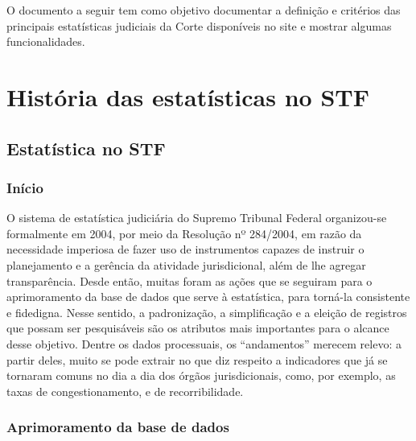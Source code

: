 \documentclass[
]{book}
\begin{document}
O documento a seguir tem como objetivo documentar a definição e critérios das principais estatísticas judiciais da Corte disponíveis no site e mostrar algumas funcionalidades.

\hypertarget{historia}{%
\chapter{História das estatísticas no STF}\label{historia}}

\hypertarget{estatuxedstica-no-stf}{%
\section{Estatística no STF}\label{estatuxedstica-no-stf}}

\hypertarget{inuxedcio}{%
\subsection{Início}\label{inuxedcio}}

O sistema de estatística judiciária do Supremo Tribunal Federal organizou-se formalmente em 2004, por meio da Resolução nº 284/2004, em razão da necessidade imperiosa de fazer uso de instrumentos capazes de instruir o planejamento e a gerência da atividade jurisdicional, além de lhe agregar transparência.
Desde então, muitas foram as ações que se seguiram para o aprimoramento da base de dados que serve à estatística, para torná-la consistente e fidedigna. Nesse sentido, a padronização, a simplificação e a eleição de registros que possam ser pesquisáveis são os atributos mais importantes para o alcance desse objetivo.
Dentre os dados processuais, os ``andamentos'' merecem relevo: a partir deles, muito se pode extrair no que diz respeito a indicadores que já se tornaram comuns no dia a dia dos órgãos jurisdicionais, como, por exemplo, as taxas de congestionamento, e de recorribilidade.

\hypertarget{aprimoramento-da-base-de-dados}{%
\subsection{Aprimoramento da base de dados}\label{aprimoramento-da-base-de-dados}}
\end{document}
